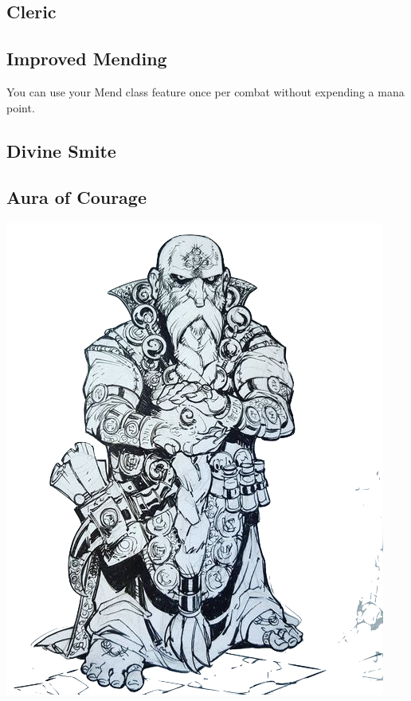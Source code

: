 
\begin{multicols*}{2}

\section{Cleric}

\subsection*{Improved Mending}

You can use your Mend class feature once per combat without expending a mana point.

\subsection*{Divine Smite}

\subsection*{Aura of Courage}




\begin{Figure}
\centering
\includegraphics[width=\textwidth]{img/cleric.png}
\end{Figure}
    
\end{multicols*}

    